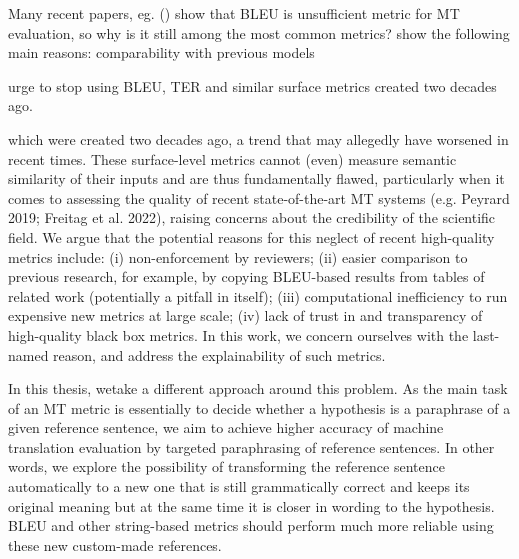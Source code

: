 Many recent papers, eg. () show that BLEU is unsufficient metric for MT evaluation, so why is it still among the most common metrics?  show the following main reasons: comparability with previous models

\cite{mathur-etal-2020-tangled} urge to stop using BLEU, TER and similar surface metrics created two decades ago.

 which were created two decades ago, a trend that may allegedly have worsened in recent times. These surface-level metrics cannot (even) measure semantic similarity
of their inputs and are thus fundamentally flawed, particularly when it comes to assessing the quality of recent state-of-the-art MT systems (e.g. Peyrard 2019; Freitag et al. 2022), raising
concerns about the credibility of the scientific field. We argue that the potential reasons for this neglect of recent high-quality metrics include: (i) non-enforcement by reviewers; (ii) easier
comparison to previous research, for example, by copying BLEU-based results from tables of related work (potentially a pitfall in itself); (iii) computational inefficiency to run expensive new
metrics at large scale; (iv) lack of trust in and transparency of high-quality black box metrics. In this work, we concern ourselves with the last-named reason, and address the explainability
of such metrics.



In this thesis, wetake a different approach around this problem. 
As the main task of an MT metric is essentially to decide whether a hypothesis is a paraphrase of a given reference sentence, we aim to achieve higher accuracy of machine translation evaluation by targeted paraphrasing of reference sentences. In other words, we explore the possibility of transforming the reference sentence automatically to a new one that is still grammatically correct and keeps its original meaning but at the same time it is closer in wording to the hypothesis.
BLEU and other string-based metrics should perform much more reliable using these new custom-made references.

